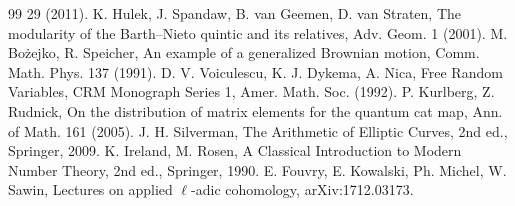 \documentclass[11pt]{article}
\theoremstyle{remark}
\begin{document}
\begin{thebibliography}{99}
29 (2011).
 K. Hulek, J. Spandaw, B. van Geemen, D. van Straten, The modularity of the Barth--Nieto
quintic and its relatives, Adv. Geom. 1 (2001).
 M. Bo\.zejko, R. Speicher, An example of a generalized Brownian motion, Comm. Math.
Phys. 137 (1991).
 D. V. Voiculescu, K. J. Dykema, A. Nica, Free Random Variables, CRM Monograph Series 1, Amer. Math.
Soc. (1992).
 P. Kurlberg, Z. Rudnick, On the distribution of matrix elements for the quantum cat map,
Ann. of Math. 161 (2005).
 J. H. Silverman, The Arithmetic of Elliptic Curves, 2nd ed., Springer, 2009.
 K. Ireland, M. Rosen, A Classical Introduction to Modern Number Theory, 2nd ed., Springer, 1990.
 E. Fouvry, E. Kowalski, Ph. Michel, W. Sawin, Lectures on applied $\ell$-adic cohomology,
arXiv:1712.03173.
\end{thebibliography}
\end{document}
